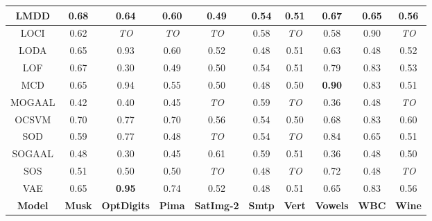 \begin{table*}[!t]
\begin{center}
\begin{small}
\begin{sc}
\begin{tabular}{|c|c|c|c|c|c|c|c|c|c|}
\hline
LMDD           &          0.68 &             0.64 &            0.60 &           0.49 &           0.54 &          0.51 &           0.67 &            0.65 &           0.56 \\
\hline
LOCI           &          0.62 &      \textit{TO} &     \textit{TO} &    \textit{TO} &           0.58 &   \textit{TO} &           0.58 &            0.90 &    \textit{TO} \\
\hline
LODA           &          0.65 &             0.93 &            0.60 &           0.52 &           0.48 &          0.51 &           0.63 &            0.48 &           0.52 \\
\hline
LOF            &          0.67 &             0.30 &            0.49 &           0.50 &           0.54 &          0.51 &           0.79 &            0.83 &           0.53 \\
\hline
MCD            &          0.65 &             0.94 &            0.55 &           0.50 &           0.48 &          0.50 &  \textbf{0.90} &            0.83 &           0.51 \\
\hline
MOGAAL         &          0.42 &             0.40 &            0.45 &    \textit{TO} &           0.59 &   \textit{TO} &           0.36 &            0.48 &    \textit{TO} \\
\hline
OCSVM          &          0.70 &             0.77 &            0.70 &           0.56 &           0.54 &          0.50 &           0.68 &            0.83 &           0.60 \\
\hline
SOD            &          0.59 &             0.77 &            0.48 &    \textit{TO} &           0.54 &   \textit{TO} &           0.84 &            0.65 &           0.51 \\
\hline
SOGAAL         &          0.48 &             0.30 &            0.45 &           0.61 &           0.59 &          0.51 &           0.36 &            0.48 &           0.50 \\
\hline
SOS            &          0.51 &             0.50 &            0.50 &    \textit{TO} &           0.48 &   \textit{TO} &           0.72 &            0.48 &    \textit{TO} \\
\hline
VAE            &          0.65 &    \textbf{0.95} &            0.74 &           0.52 &           0.48 &          0.51 &           0.65 &            0.83 &           0.56 \\
\hline
\hline
\textbf{Model} & \textbf{Musk} & \textbf{OptDigits} & \textbf{Pima} & \textbf{SatImg-2} & \textbf{Smtp} & \textbf{Vert} & \textbf{Vowels} & \textbf{WBC}  & \textbf{Wine} \\

\end{tabular}
\end{sc}
\end{small}
\end{center}
\end{table*}
